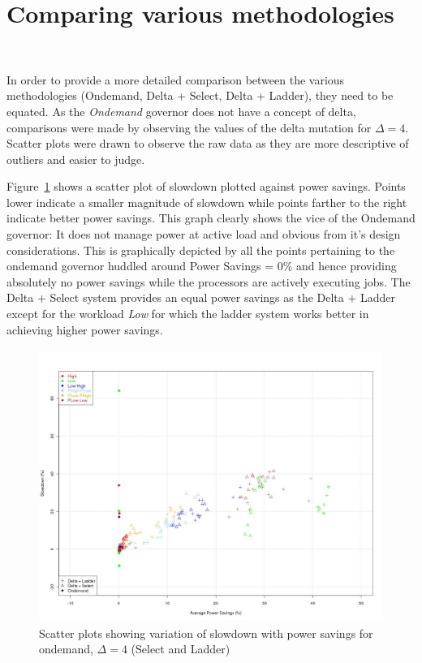 \section{Comparing various methodologies}~\label{sec:compare}

In order to provide a more detailed comparison between the various methodologies
(Ondemand, Delta + Select, Delta + Ladder), they need to be equated. As the \textit{Ondemand}
governor does not have a concept of delta, comparisons were made by observing 
the values of the delta mutation for $\Delta = 4$. Scatter plots were drawn to 
observe the raw data as they are more descriptive of outliers and easier to judge.

Figure~\ref{fig:pwr_vs_slowdown} shows a scatter plot of slowdown plotted against power savings. Points
lower indicate a smaller magnitude of slowdown while points farther to the right indicate better power
savings. This graph clearly shows the vice of the Ondemand governor: It does not manage power at active
load and obvious from it's design considerations. This is graphically depicted by all the points pertaining
to the ondemand governor huddled around Power Savings = 0\% and hence providing absolutely no power savings
while the processors are actively executing jobs. The Delta + Select system provides an equal power savings
as the Delta + Ladder except for the workload \textit{Low} for which the ladder system works better in achieving
higher power savings.

\begin{figure}[h!]
  \begin{center}
    \includegraphics[height=3.5in]{figures/pwr_vs_slowdown_delta_4.jpg}%
    \caption{Scatter plots showing variation of slowdown with power savings for ondemand, $\Delta=4$ (Select and Ladder)}
    \label{fig:pwr_vs_slowdown}
  \end{center}
\end{figure}

